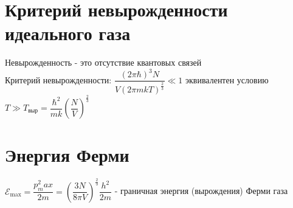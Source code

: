 \begin{multicols*}{2}
		\section{Критерий невырожденности идеального газа}
		Невырожденность - это отсутствие квантовых связей\\
		Критерий невырожденности: $\dfrac{(2\pi \hbar)^3 N}{V(2\pi mkT)^{\frac{2}{3}}} \ll 1$ эквивалентен условию $T\gg T_{\text{выр}} = \dfrac{\hbar^2}{mk} \left(\dfrac{N}{V}\right)^{\frac{2}{3}}$

		\section{Энергия Ферми}
		${\mathcal{E}}_{\text{max}} = \dfrac{p^2_max}{2m} = \left(\dfrac{3N}{8\pi V}\right)^{\frac{2}{3}}\dfrac{h^2}{2m}$ - граничная энергия (вырождения) Ферми газа
	\end{multicols*}

